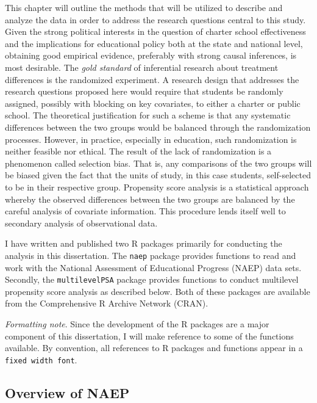 \documentclass[letterpaper,12p,twoside]{article} %
\begin{document}
This chapter will outline the methods that will be utilized to describe and analyze the data in order to address the research questions central to this study. Given the strong political interests in the question of charter school effectiveness and the implications for educational policy both at the state and national level, obtaining good empirical evidence, preferably with strong causal inferences, is most desirable. The \textit{gold standard} of inferential research about treatment differences is the randomized experiment. A research design that addresses the research questions proposed here would require that students be randomly assigned, possibly with blocking on key covariates, to either a charter or public school. The theoretical justification for such a scheme is that any systematic differences between the two groups would be balanced through the randomization processes. However, in practice, especially in education, such randomization is neither feasible nor ethical. The result of the lack of randomization is a phenomenon called selection bias. That is, any comparisons of the two groups will be biased given the fact that the units of study, in this case students, self-selected to be in their respective group. Propensity score analysis \cite{RosenbaumRubin1983} is a statistical approach whereby the observed differences between the two groups are balanced by the careful analysis of covariate information. This procedure lends itself well to secondary analysis of observational data.

I have written and published two R packages primarily for conducting the analysis in this dissertation. The \texttt{naep} package provides functions to read and work with the National Assessment of Educational Progress (NAEP) data sets. Secondly, the \texttt{multilevelPSA} package provides functions to conduct multilevel propensity score analysis as described below. Both of these packages are available from the Comprehensive R Archive Network (CRAN). 

\textit{Formatting note}. Since the development of the R packages are a major component of this dissertation, I will make reference to some of the functions available. By convention, all references to R packages and functions appear in a \texttt{fixed width font}.

\subsection{Overview of NAEP}
\end{document}
